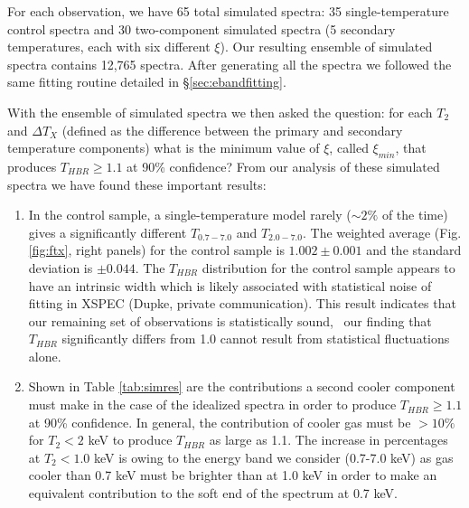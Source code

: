 For each observation, we have 65 total simulated spectra: 35
single-temperature control spectra and 30 two-component simulated
spectra (5 secondary temperatures, each with six different $\xi$). Our
resulting ensemble of simulated spectra contains 12,765 spectra. After
generating all the spectra we followed the same fitting routine
detailed in \S\ref{sec:ebandfitting}.

With the ensemble of simulated spectra we then asked the question: for
each $T_2$ and $\Delta T_X$ (defined as the difference between the
primary and secondary temperature components) what is the minimum
value of $\xi$, called $\xi_{min}$, that produces $T_{HBR} \geq 1.1$
at 90\% confidence? From our analysis of these simulated spectra we
have found these important results:
\begin{enumerate}

\item In the control sample, a single-temperature model rarely ($\sim
  2\%$ of the time) gives a significantly different $T_{0.7-7.0}$ and
  $T_{2.0-7.0}$. The weighted average (Fig. \ref{fig:ftx}, right
  panels) for the control sample is $1.002 \pm 0.001$ and the standard
  deviation is $\pm0.044$. The $T_{HBR}$ distribution for the control
  sample appears to have an intrinsic width which is likely associated
  with statistical noise of fitting in {\textsc{XSPEC}} (Dupke,
  private communication). This result indicates that our remaining set
  of observations is statistically sound, \eg\ our finding that
  $T_{HBR}$ significantly differs from 1.0 cannot result from
  statistical fluctuations alone.

\item Shown in Table \ref{tab:simres} are the contributions a second
  cooler component must make in the case of the idealized spectra in
  order to produce $T_{HBR} \geq 1.1$ at 90\% confidence. In general,
  the contribution of cooler gas must be $> 10\%$ for $T_2 < 2$ keV to
  produce $T_{HBR}$ as large as 1.1. The increase in percentages at
  $T_2 < 1.0$ keV is owing to the energy band we consider (0.7-7.0
  keV) as gas cooler than 0.7 keV must be brighter than at 1.0 keV in
  order to make an equivalent contribution to the soft end of the
  spectrum at 0.7 keV.


\end{enumerate}
